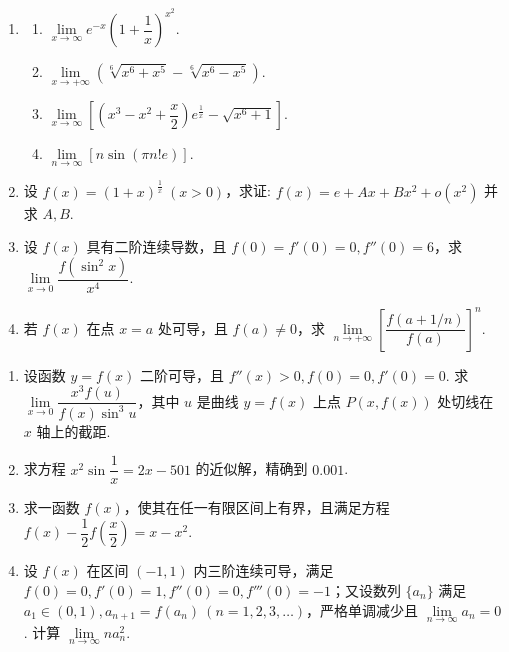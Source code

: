 \newpage

\begin{enumerate}[label=\textbf{\arabic*.}, itemsep=6cm, resume]
    \item [8. (续)]
    \begin{enumerate}[label=(\arabic*), start=3]
        \item $\lim\limits_{x \to \infty} e^{-x}\left(1+\dfrac{1}{x}\right)^{x^2}$.
        \item $\lim\limits_{x \to +\infty} \left(\sqrt[6]{x^6+x^5} - \sqrt[6]{x^6-x^5}\right)$.
        \item $\lim\limits_{x \to \infty} \left[\left(x^3 - x^2 + \dfrac{x}{2}\right)e^{\frac{1}{x}} - \sqrt{x^6+1}\right]$.
        \item $\lim\limits_{n \to \infty} [n\sin(\pi n!e)]$.
    \end{enumerate}
    
    \item 设 $f(x) = (1+x)^{\frac{1}{x}} \ (x>0)$，求证:
    $ f(x) = e + Ax + Bx^2 + o(x^2) $
    并求 $A,B$.
    
    \item 设 $f(x)$ 具有二阶连续导数，且 $f(0)=f'(0)=0, f''(0)=6$，求 $\lim\limits_{x \to 0} \dfrac{f\left(\sin^2 x\right)}{x^4}$.
    
    \item 若 $f(x)$ 在点 $x=a$ 处可导，且 $f(a) \ne 0$，求 $\lim\limits_{n \to +\infty} \left[\dfrac{f(a+1/n)}{f(a)}\right]^n$.
\end{enumerate}

\newpage

\begin{enumerate}[label=\textbf{\arabic*.}, itemsep=6cm, resume]
    \item 设函数 $y=f(x)$ 二阶可导，且 $f''(x)>0, f(0)=0, f'(0)=0$. 求 $\lim\limits_{x \to 0} \dfrac{x^3f(u)}{f(x)\sin^3 u}$，其中 $u$ 是曲线 $y=f(x)$ 上点 $P(x,f(x))$ 处切线在 $x$ 轴上的截距.
    
    \item 求方程 $x^2\sin\dfrac{1}{x} = 2x - 501$ 的近似解，精确到 $0.001$.
    
    \item 求一函数 $f(x)$，使其在任一有限区间上有界，且满足方程
    $ f(x) - \dfrac{1}{2}f\left(\dfrac{x}{2}\right) = x - x^2. $
    
    \item 设 $f(x)$ 在区间 $(-1,1)$ 内三阶连续可导，满足 $f(0)=0, f'(0)=1, f''(0)=0, f'''(0)=-1$；又设数列 $\{a_n\}$ 满足 $a_1 \in (0,1), a_{n+1}=f(a_n) \ (n=1,2,3,\dots)$，严格单调减少且 $\lim\limits_{n \to \infty} a_n=0$. 计算 $\lim\limits_{n \to \infty} na_n^2$.
\end{enumerate}

